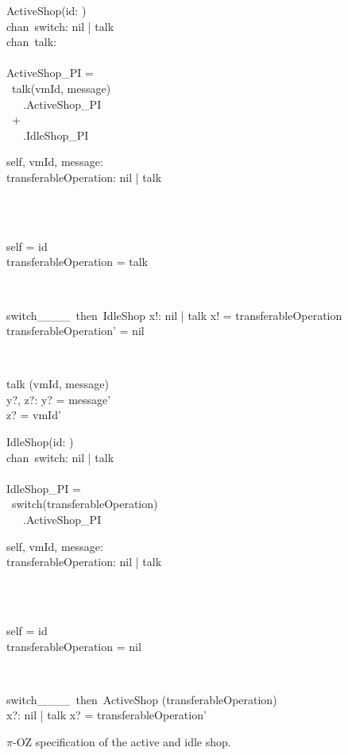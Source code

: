 \begin{figure}[H]
\centering
\begin{sidebyside}
\begin{class}{ActiveShop(id: \integer)}
\ 
\\chan\ switch: nil | talk
\ 
\\chan\ talk:\integer \times \integer
\ \\ \
\\ActiveShop\_PI = 
\\ \ talk(vmId, message)
\ \\ \ \ \ .ActiveShop\_PI
\\ \ + 
\ \\ \ \ \ .IdleShop\_PI
\\\begin{state}
self, vmId, message: \integer
\\transferableOperation: nil | talk
\end{state} 
\\
\begin{init}
\\self = id
\\transferableOperation = talk
\end{init} 
\\
\begin{op}{switch\_\_\_\_\ then\ IdleShop}
x!: nil | talk
\ST
x! = transferableOperation
\\transferableOperation' = nil
\end{op}
\\
\begin{op}{talk}
\Delta (vmId, message)
\\y?, z?: \integer
\ST
y? = message'
\\z? = vmId'
\end{op}
\end{class}
\nextside
\begin{class}{IdleShop(id: \integer)}
\ 
\\chan\ switch: nil | talk
\ \\ \
\\IdleShop\_PI = 
\\ \  switch(transferableOperation)
\ \\ \ \ \ .ActiveShop\_PI
\\
\begin{state}
self, vmId, message: \integer
\\transferableOperation: nil | talk
\end{state} 
\\
\begin{init}
\\self = id
\\transferableOperation = nil
\end{init} 
\\
\begin{op}{switch\_\_\_\_\ then\ ActiveShop}
\Delta (transferableOperation)
\\x?: nil | talk
\ST
x? = transferableOperation'
\end{op}
\end{class}
\end{sidebyside}
\caption{$\pi$-OZ specification of the active and idle shop.}
\label{comp_oz_pi_statefull_shop}
\end{figure}